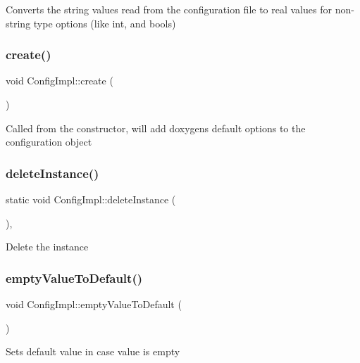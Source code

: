 Converts the string values read from the configuration file to real values for non-\/string type options (like int, and bools) \mbox{\label{class_config_impl_a0e1887e271fe89b5f3e2154e344ad4b1}} 
\subsubsection{\texorpdfstring{create()}{create()}}
{\footnotesize\ttfamily void Config\+Impl\+::create (\begin{DoxyParamCaption}{ }\end{DoxyParamCaption})}

Called from the constructor, will add doxygen\textquotesingle{}s default options to the configuration object \mbox{\label{class_config_impl_a11be9a99f82898b014f311b5fd9437c1}} 
\subsubsection{\texorpdfstring{deleteInstance()}{deleteInstance()}}
{\footnotesize\ttfamily static void Config\+Impl\+::delete\+Instance (\begin{DoxyParamCaption}{ }\end{DoxyParamCaption})\hspace{0.3cm}{\ttfamily [inline]}, {\ttfamily [static]}}

Delete the instance \mbox{\label{class_config_impl_ae0072f7a4546b40a6c445e826bb6e027}} 
\subsubsection{\texorpdfstring{emptyValueToDefault()}{emptyValueToDefault()}}
{\footnotesize\ttfamily void Config\+Impl\+::empty\+Value\+To\+Default (\begin{DoxyParamCaption}{ }\end{DoxyParamCaption})}

Sets default value in case value is empty \mbox{\label{class_config_impl_af98aea170483825616a3d8888957f3e4}} 
